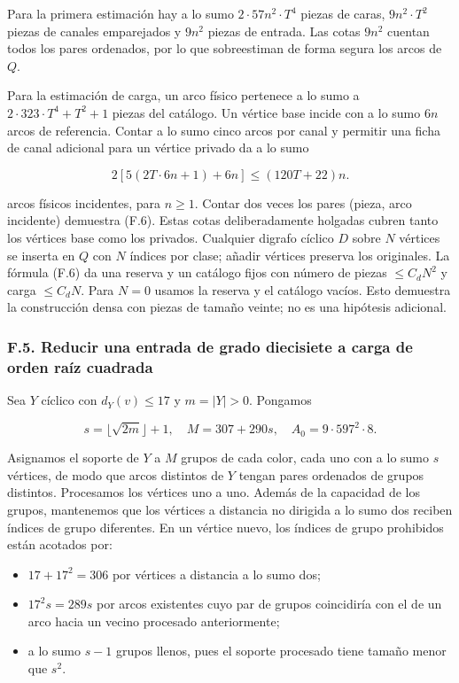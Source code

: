 \documentclass[spanish,11pt,a4paper]{article}
\providecommand{\tightlist}{\setlength{\itemsep}{0pt}\setlength{\parskip}{0pt}}
\begin{document}
Para la primera estimación hay a lo sumo \(2\cdot 57n^{2}\cdot T^{4}\) piezas de caras, \(9n^{2}\cdot T^{2}\) piezas de canales emparejados y \(9n^{2}\) piezas de entrada. Las cotas \(9n^{2}\) cuentan todos los pares ordenados, por lo que sobreestiman de forma segura los arcos de \(Q\).

Para la estimación de carga, un arco físico pertenece a lo sumo a \(2\cdot 323\cdot T^{4}+T^{2}+1\) piezas del catálogo. Un vértice base incide con a lo sumo \(6n\) arcos de referencia. Contar a lo sumo cinco arcos por canal y permitir una ficha de canal adicional para un vértice privado da a lo sumo

\[2[5(2T\cdot6n+1)+6n]\le(120T+22)n.\]

arcos físicos incidentes, para \(n\ge 1\). Contar dos veces los pares (pieza, arco incidente) demuestra (F.6). Estas cotas deliberadamente holgadas cubren tanto los vértices base como los privados. Cualquier digrafo cíclico \(D\) sobre \(N\) vértices se inserta en \(Q\) con \(N\) índices por clase; añadir vértices preserva los originales. La fórmula (F.6) da una reserva y un catálogo fijos con número de piezas \(\le C_dN^2\) y carga \(\le C_dN\). Para \(N=0\) usamos la reserva y el catálogo vacíos. Esto demuestra la construcción densa con piezas de tamaño veinte; no es una hipótesis adicional.

\subsubsection{F.5. Reducir una entrada de grado diecisiete a carga de orden raíz cuadrada}\label{f.5.-reducir-una-entrada-de-grado-diecisiete-a-carga-de-orden-rauxedz-cuadrada}

Sea \(Y\) cíclico con \(d_{Y}(v)\le 17\) y \(m=|Y|>0\). Pongamos

\[s=\lfloor\sqrt{2m}\rfloor+1,\quad M=307+290s,\quad A_0=9\cdot597^2\cdot8.\tag{F.7}\]

Asignamos el soporte de \(Y\) a \(M\) grupos de cada color, cada uno con a lo sumo \(s\) vértices, de modo que arcos distintos de \(Y\) tengan pares ordenados de grupos distintos. Procesamos los vértices uno a uno. Además de la capacidad de los grupos, mantenemos que los vértices a distancia no dirigida a lo sumo dos reciben índices de grupo diferentes. En un vértice nuevo, los índices de grupo prohibidos están acotados por:

\begin{itemize}
\tightlist
\item
  \(17+17^{2}=306\) por vértices a distancia a lo sumo dos;
\item
  \(17^2s=289s\) por arcos existentes cuyo par de grupos coincidiría con el de un arco hacia un vecino procesado anteriormente;
\item
  a lo sumo \(s-1\) grupos llenos, pues el soporte procesado tiene tamaño menor que \(s^{2}\).
\end{itemize}
\end{document}
